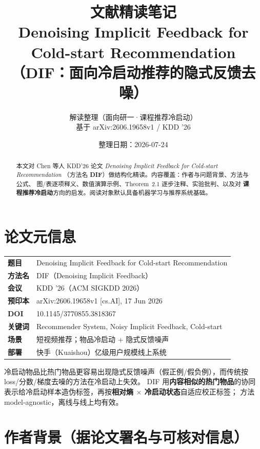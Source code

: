 \documentclass[11pt,a4paper]{ctexart}
\title{\textbf{文献精读笔记}\\[0.4em]
\large Denoising Implicit Feedback for Cold-start Recommendation\\[0.2em]
\large （DIF：面向冷启动推荐的隐式反馈去噪）}
\author{解读整理（面向研一·课程推荐冷启动）\\
基于 arXiv:2606.19658v1 / KDD '26}
\date{整理日期：2026-07-24}
\begin{document}
\maketitle

\begin{abstract}
\noindent
本文对 Chen 等人 KDD'26 论文
\textit{Denoising Implicit Feedback for Cold-start Recommendation}
（方法名 \textbf{DIF}）做结构化精读。内容覆盖：作者与问题背景、方法与公式、
图/表逐项释义、数值演算示例、Theorem~2.1 逐步注释、实验批判、以及对
\textbf{课程推荐冷启动}方向的启发。阅读对象默认具备机器学习与推荐系统基础。
\end{abstract}

\tableofcontents
\newpage

\section{论文元信息}

\begin{tabularx}{\textwidth}{@{}lX@{}}
\toprule
\textbf{题目} & Denoising Implicit Feedback for Cold-start Recommendation \\
\textbf{方法名} & DIF（Denoising Implicit Feedback） \\
\textbf{会议} & KDD '26（ACM SIGKDD 2026） \\
\textbf{预印本} & arXiv:2606.19658v1 [cs.AI], 17 Jun 2026 \\
\textbf{DOI} & 10.1145/3770855.3818367 \\
\textbf{关键词} & Recommender System, Noisy Implicit Feedback, Cold-start \\
\textbf{场景} & 短视频推荐；物品冷启动 + 隐式反馈噪声 \\
\textbf{部署} & 快手（Kuaishou）亿级用户规模线上系统 \\
\bottomrule
\end{tabularx}

\begin{keybox}[一句话概括]
冷启动物品比热门物品更容易出现隐式反馈噪声（假正例/假负例），而传统按 loss/分数/梯度去噪的方法在冷启动上失效。
DIF 用\textbf{内容相似的热门物品}的协同表示给冷启动样本造伪标签，再按\textbf{相对熵 $\times$ 冷启动状态}自适应校正标签；
方法 model-agnostic，离线与线上均有效。
\end{keybox}

\section{作者背景（据论文署名与可核对信息）}
\end{document}
